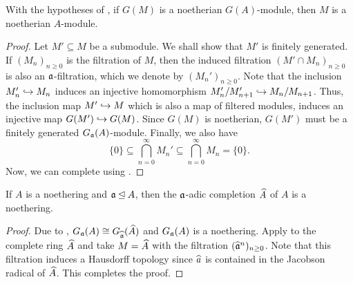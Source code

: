 \begin{corollary}
    With the hypotheses of , if $G(M)$ is a noetherian $G(A)$-module, then $M$ is a noetherian $A$-module.
\end{corollary}
\begin{proof}
    Let $M'\subseteq M$ be a submodule. We shall show that $M'$ is finitely generated. If $(M_n)_{n\ge 0}$ is the filtration of $M$, then the induced filtration $(M'\cap M_n)_{n\ge 0}$ is also an $\mathfrak a$-filtration, which we denote by $(M_n')_{n\ge 0}$. Note that the inclusion $M_n'\hookrightarrow M_n$ induces an injective homomorphism $M_n'/M_{n + 1}'\hookrightarrow M_n/M_{n + 1}$. Thus, the inclusion map $M'\hookrightarrow M$ which is also a map of filtered modules, induces an injective map $G(M')\hookrightarrow G(M)$. Since $G(M)$ is noetherian, $G(M')$ must be a finitely generated $G_\mathfrak a(A)$-module. Finally, we also have 
    \begin{equation*}
        \{0\}\subseteq\bigcap_{n = 0}^\infty M_n'\subseteq\bigcap_{n = 0}^\infty M_n = \{0\}.
    \end{equation*}
    Now, we can complete using .
\end{proof}


\begin{theorem}
    If $A$ is a noethering and $\mathfrak a\unlhd A$, then the $\mathfrak a$-adic completion $\widehat{A}$ of $A$ is a noethering.
\end{theorem}
\begin{proof}
    Due to , $G_\mathfrak a(A)\cong G_{\widehat{\mathfrak a}}(\widehat{A})$ and $G_{\mathfrak a}(A)$ is a noethering. Apply  to the complete ring $\widehat{A}$ and take $M = \widehat{A}$ with the filtration $(\widehat{\mathfrak a}^n)_{n\ge 0}$. Note that this filtration induces a Hausdorff topology since $\widehat{a}$ is contained in the Jacobson radical of $\widehat{A}$. This completes the proof.
\end{proof}